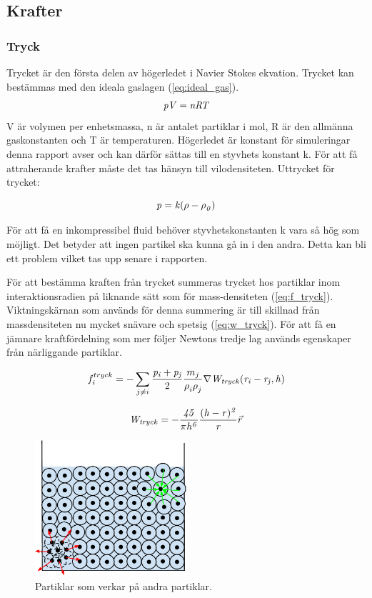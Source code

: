 \documentclass[a4paper,12pt,oneside,final]{extarticle}
\begin{document}
\subsection{Krafter}
\subsubsection{Tryck}
Trycket är den första delen av högerledet i Navier Stokes ekvation.
Trycket kan bestämmas med den ideala gaslagen (\ref{eq:ideal_gas}).
\begin{equation} \label{eq:ideal_gas}
{\it pV = nRT}
\end{equation}
V är volymen per enhetsmassa, n är antalet partiklar i mol, R är den allmänna gaskonstanten och T är temperaturen.
Högerledet är konstant för simuleringar denna rapport avser och kan därför sättas till en styvhets konstant k. 
För att få attraherande krafter måste det tas hänsyn till vilodensiteten. Uttrycket för trycket:

\begin{equation}
{\it p = k(\rho - \rho^{}_{0})}
\end{equation}


För att få en inkompressibel fluid behöver styvhetskonstanten k vara så hög som möjligt. Det betyder att ingen partikel ska kunna gå in i den andra. Detta kan bli ett problem vilket tas upp senare i rapporten.

För att bestämma kraften från trycket summeras trycket hos partiklar inom interaktionsradien på liknande sätt som för mass-densiteten (\ref{eq:f_tryck}).
Viktningskärnan som används för denna summering är till skillnad från massdensiteten nu mycket snävare och spetsig (\ref{eq:w_tryck}).
För att få en jämnare kraftfördelning som mer följer Newtons tredje lag används egenskaper från närliggande partiklar.

\begin{equation} \label{eq:f_tryck}
f^{tryck}_i = - \sum_{j \neq i} \frac{\it p_i + p_j}{2} \frac{m_j}{\rho^{}_{i} \rho^{}_{j}} \nabla {\it W_{tryck} (r_i - r_j,h)}
\end{equation}

\begin{equation} \label{eq:w_tryck}
{\it W_{tryck} = -\frac{45}{\pi h^6}\frac{(h-r)^2}{r}} \vec{r}
\end{equation}


\begin{figure}[H]
  \centering
    \includegraphics[width=0.5\textwidth]{bilder/partiklar_komprimering}
  \caption{Partiklar som verkar på andra partiklar.}
\end{figure}
\end{document}
